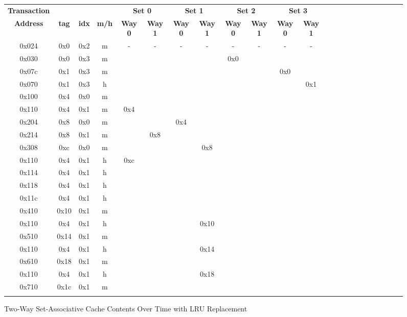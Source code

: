 \documentclass[10pt]{article}
\begin{document}
\begin{figure}[H]
\centering
\begin{tabular}{@{\extracolsep{3pt}}cccccccccccc@{}}
\Xhline{2\arrayrulewidth}
\textbf{Transaction} & & & & \multicolumn{2}{c}{\textbf{Set 0}} & \multicolumn{2}{c}{\textbf{Set 1}} & \multicolumn{2}{c}{\textbf{Set 2}} & \multicolumn{2}{c}{\textbf{Set 3}} \\
\cline{5-6}
\cline{7-8}
\cline{9-10}
\cline{11-12}
\textbf{Address} & \textbf{tag} & \textbf{idx} & \textbf{m/h} & \textbf{Way 0} & \textbf{Way 1} & \textbf{Way 0} & \textbf{Way 1} & \textbf{Way 0} & \textbf{Way 1} & \textbf{Way 0} & \textbf{Way 1} \\
\Xhline{2\arrayrulewidth}
0x024 & 0x0 & 0x2 & m &  -  &  -  &  -  &  -  &  -  &  -  &  -  &  -  \\
0x030 & 0x0 & 0x3 & m &     &     &     &     & 0x0 &     &     &     \\
0x07c & 0x1 & 0x3 & m &     &     &     &     &     &     & 0x0 &     \\
0x070 & 0x1 & 0x3 & h &     &     &     &     &     &     &     & 0x1 \\
0x100 & 0x4 & 0x0 & m &     &     &     &     &     &     &     &     \\
0x110 & 0x4 & 0x1 & m & 0x4 &     &     &     &     &     &     &     \\
0x204 & 0x8 & 0x0 & m &     &     & 0x4 &     &     &     &     &     \\
0x214 & 0x8 & 0x1 & m &     & 0x8 &     &     &     &     &     &     \\
0x308 & 0xc & 0x0 & m &     &     &     & 0x8 &     &     &     &     \\
0x110 & 0x4 & 0x1 & h & 0xc &     &     &     &     &     &     &     \\
0x114 & 0x4 & 0x1 & h &     &     &     &     &     &     &     &     \\
0x118 & 0x4 & 0x1 & h &     &     &     &     &     &     &     &     \\
0x11c & 0x4 & 0x1 & h &     &     &     &     &     &     &     &     \\
0x410 & 0x10& 0x1 & m &     &     &     &     &     &     &     &     \\
0x110 & 0x4 & 0x1 & h &     &     &     & 0x10&     &     &     &     \\
0x510 & 0x14& 0x1 & m &     &     &     &     &     &     &     &     \\
0x110 & 0x4 & 0x1 & h &     &     &     & 0x14&     &     &     &     \\
0x610 & 0x18& 0x1 & m &     &     &     &     &     &     &     &     \\
0x110 & 0x4 & 0x1 & h &     &     &     & 0x18&     &     &     &     \\
0x710 & 0x1c& 0x1 & m &     &     &     &     &     &     &     &     \\
\Xhline{2\arrayrulewidth}
\multicolumn{12}{l}{\textbf{Number of Misses = 12}}
\hline
\multicolumn{12}{l}{\textbf{Miss Rate = 0.6}}
\Xhline{2\arrayrulewidth}
\end{tabular}
\caption{Two-Way Set-Associative Cache Contents Over Time with LRU Replacement}
\end{figure}
\end{document}
